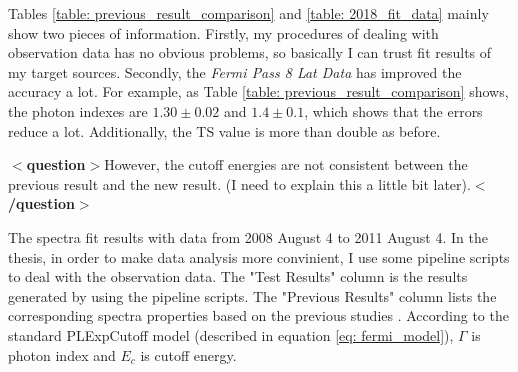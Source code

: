 \documentclass[12pt]{report}
\newcommand{\mycaption}[1]{\protect \caption{#1}}
\newcommand{\question}[1]{
  $<$\textbf{question}$>$#1$<$\textbf{/question}$>$
}
\begin{document}
          Tables \ref{table: previous_result_comparison} and \ref{table: 2018_fit_data} mainly 
          show two pieces of information. Firstly, my procedures of dealing with observation 
          data has no obvious problems, so basically I can trust fit results of my target 
          sources. Secondly, the \textit{Fermi Pass 8 Lat Data} has improved the accuracy a 
          lot. For example, as Table \ref{table: previous_result_comparison} shows, the photon 
          indexes are $1.30\pm0.02$ and $1.4\pm0.1$, which shows that the errors reduce a lot. 
          Additionally, the TS value is more than double as before.
          \question{However, the cutoff energies are not consistent between the previous result and the new result.
            (I need to explain this a little bit later).}
          \vspace{1cm} 
          \begin{table}[!ht]
            \centering
            \vspace{0.5cm}
              \centering
              \mycaption{The spectra fit results with data from 2008 August 4 to 2011 August 4. 
                In the thesis, in order to make data 
                analysis more convinient, I use some pipeline scripts to deal with the 
                observation data. The "Test Results" column is the results generated by 
                using the pipeline scripts. The "Previous Results" column lists the 
                corresponding spectra properties based on the previous studies 
                \cite{0067-0049-208-2-17}. According to the standard PLExpCutoff model 
                (described in equation \ref{eq: fermi_model}), $\Gamma$ is photon index 
                and $E_c$ is cutoff energy.}
              \label{table: previous_result_comparison}
          \end{table}
          \vspace{1cm}            
\end{document}

